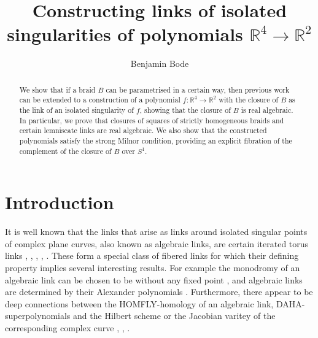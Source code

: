 \documentclass[notitlepage,12pt]{revtex4-1}
\begin{document}
\title{Constructing links of isolated singularities of polynomials $\mathbb{R}^4\to\mathbb{R}^2$}

\author{
Benjamin Bode}

\address{H H Wills Physics Laboratory, University of Bristol, Bristol BS8 1TL, UK\\
benjamin.bode@bristol.ac.uk
}


\begin{abstract}
We show that if a braid $B$ can be parametrised in a certain way, then previous work \cite{bode:2016polynomial} can be extended to a construction of a polynomial $f:\mathbb{R}^4\to\mathbb{R}^2$ with the closure of $B$ as the link of an isolated singularity of $f$, showing that the closure of $B$ is real algebraic. In particular, we prove that closures of squares of strictly homogeneous braids and certain lemniscate links are real algebraic. We also show that the constructed polynomials satisfy the strong Milnor condition, providing an explicit fibration of the complement of the closure of $B$ over $S^1$.
\end{abstract}
\maketitle

\section{Introduction}\label{sec:intro}
It is well known that the links that arise as links around isolated singular points of complex plane curves, also known as algebraic links, are certain iterated torus links \cite{brauner:1928geometrie}, \cite{burau:1933knoten}, \cite{burau:1934verkettungen}, \cite{kahler:1929verzweigung}, \cite{zariski:1932topology}. 
These form a special class of fibered links for which their defining property implies several interesting results. For example the monodromy of an algebraic link can be chosen to be without any fixed point \cite{acampo:1975mono},\cite{le:1975mono} and algebraic links are determined by their Alexander polynomials \cite{le:1972noeuds}. Furthermore, there appear to be deep connections between the HOMFLY-homology of an algebraic link, DAHA-superpolynomials and the Hilbert scheme or the Jacobian varitey of the corresponding complex curve \cite{cp:2016daha}, \cite{ors:2012hilbert}, \cite{os:2012hilbert}.
\end{document}
